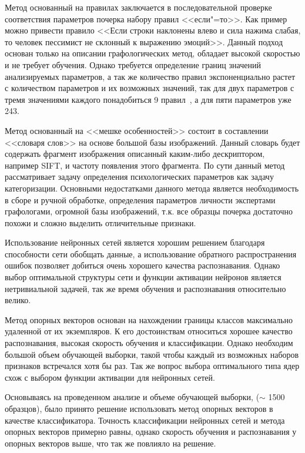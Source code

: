 Метод основанный на правилах заключается в последовательной проверке соответствия параметров почерка набору правил <<если"=то>>. Как пример можно привести правило <<Если строки наклонены влево и сила нажима слабая, то человек пессимист не склонный к выражению эмоций>>. Данный подход основан только на описании графологических метод, обладает высокой скоростью и не требует обучения. Однако требуется определение границ значений анализируемых параметров, а так же количество правил экспоненциально растет с количеством параметров и их возможных значений, так для двух параметров с тремя значениями каждого понадобиться 9 правил~\cite{champa_ananda_kumar_rule_base}, а для пяти параметров уже 243.

Метод основанный на <<мешке особенностей>> состоит в составлении <<словаря слов>> на основе большой базы изображений. Данный словарь будет содержать фрагмент изображения описанный каким-либо дескриптором, например SIFT, и частоту появления этого фрагмента. По сути данный метод рассматривает задачу определения психологических параметров как задачу категоризации. Основными недостатками данного метода является необходимость в сборе и ручной обработке, определения параметров личности экспертами графологами, огромной базы изображений, т.к. все образцы почерка достаточно похожи и сложно выделить отличительные признаки.

Использование нейронных сетей является хорошим решением благодаря способности сети обобщать данные, а использование обратного распространения ошибок позволяет добиться очень хорошего качества распознавания. Однако выбор оптимальной структуры сети и функции активации нейронов является нетривиальной задачей, так же время обучения и распознавания относительно велико.

Метод опорных векторов основан на нахождении границы классов максимально удаленной от их экземпляров. К его достоинствам относиться хорошее качество распознавания, высокая скорость обучения и классификации. Однако необходим большой объем обучающей выборки, такой чтобы каждый из возможных наборов признаков встречался хотя бы раз. Так же вопрос выбора оптимального типа ядер схож с выбором функции активации для нейронных сетей.

Основываясь на проведенном анализе и объеме обучающей выборки, ($\sim$ 1500 образцов), было принято решение использовать метод опорных векторов в качестве классификатора. Точность классификации нейронных сетей и метода опорных векторов примерно равны, однако скорость обучения и распознавания у опорных векторов выше, что так же повлияло на решение.

